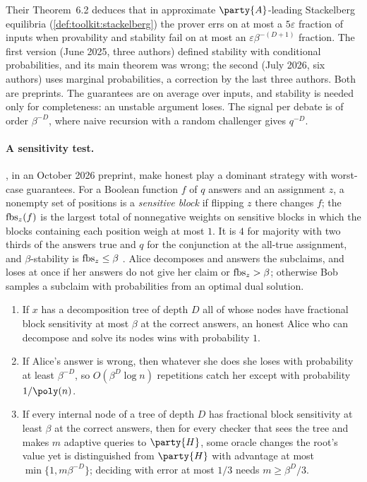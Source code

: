 \begin{refsection}
Their Theorem~6.2 deduces that in approximate $\party{A}$-leading Stackelberg equilibria (\cref{def:toolkit:stackelberg}) the prover errs on at most a $5\varepsilon$ fraction of inputs when provability and stability fail on at most an $\varepsilon\beta^{-(D+1)}$ fraction. The first version (June 2025, three authors) defined stability with conditional probabilities, and its main theorem was wrong; the second (July 2026, six authors) uses marginal probabilities, a correction by the last three authors. Both are preprints. The guarantees are on average over inputs, and stability is needed only for completeness: an unstable argument loses. The signal per debate is of order $\beta^{-D}$, where naive recursion with a random challenger gives $q^{-D}$.

\paragraph{A sensitivity test.} \Textcite{LiEtAl2026}, in an October 2026 preprint, make honest play a dominant strategy with worst-case guarantees. For a Boolean function $f$ of $q$ answers and an assignment $z$, a nonempty set of positions is a \emph{sensitive block} if flipping $z$ there changes $f$; the  $\operatorname{fbs}_z(f)$ is the largest total of nonnegative weights on sensitive blocks in which the blocks containing each position weigh at most $1$. It is $4$ for majority with two thirds of the answers true and $q$ for the conjunction at the all-true assignment, and $\beta$-stability is $\operatorname{fbs}_z\le\beta$ \parencite[Observation~A.7]{BrownCohenEtAl2026}. Alice decomposes and answers the subclaims, and loses at once if her answers do not give her claim or $\operatorname{fbs}_z>\beta$; otherwise Bob samples a subclaim with probabilities from an optimal dual solution.

\begin{theorem}\label{thm:efficientdebate:sensitive}
\begin{enumerate}
\item If $x$ has a decomposition tree of depth $D$ all of whose nodes have fractional block sensitivity at most $\beta$ at the correct answers, an honest Alice who can decompose and solve its nodes wins with probability $1$.
\item If Alice's answer is wrong, then whatever she does she loses with probability at least $\beta^{-D}$, so $O(\beta^D\log n)$ repetitions catch her except with probability $1/\poly(n)$.
\item If every internal node of a tree of depth $D$ has fractional block sensitivity at least $\beta$ at the correct answers, then for every checker that sees the tree and makes $m$ adaptive queries to $\party{H}$, some oracle changes the root's value yet is distinguished from $\party{H}$ with advantage at most $\min\{1,m\beta^{-D}\}$; deciding with error at most $1/3$ needs $m\ge\beta^D/3$.
\end{enumerate}
\end{theorem}


\end{refsection}
